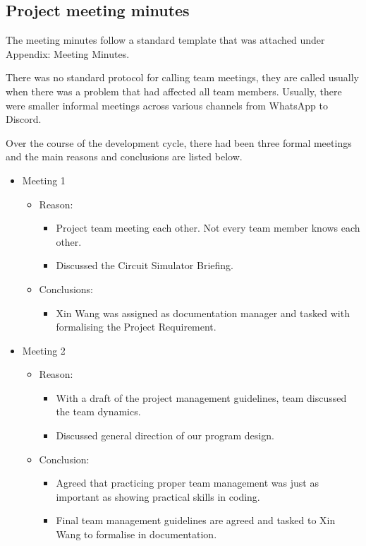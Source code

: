 \documentclass[12pt,a4paper]{article}
\begin{document}
	\vfill
	\pagebreak

	\subsection{Project meeting minutes}
	The meeting minutes follow a standard template that was attached under Appendix: Meeting Minutes. \par
	There was no standard protocol for calling team meetings, they are called usually when there was a problem
	that had affected all team members. Usually, there were smaller informal meetings across various channels from 
	WhatsApp to Discord. \par
	Over the course of the development cycle, there had been three formal meetings and the main reasons and conclusions
	are listed below.
	\begin{itemize}
		\item Meeting 1
		\begin{itemize}
			\item Reason: 
			\begin{itemize}
				\item Project team meeting each other. Not every team member knows each other.
				\item Discussed the Circuit Simulator Briefing.
			\end{itemize}
			\item Conclusions:
			\begin{itemize}
				\item Xin Wang was assigned as documentation manager and tasked with formalising the Project Requirement.
			\end{itemize}
		\end{itemize}
		\item Meeting 2
		\begin{itemize}
			\item Reason:
			\begin{itemize}
				\item With a draft of the project management guidelines, team discussed the team dynamics.
				\item Discussed general direction of our program design.
			\end{itemize}
			\item Conclusion:
			\begin{itemize}
				\item Agreed that practicing proper team management was just as important as showing practical skills 
				in coding.
				\item Final team management guidelines are agreed and tasked to Xin Wang to formalise in documentation.

\end{itemize}
\end{itemize}
\end{itemize}
\end{document}
